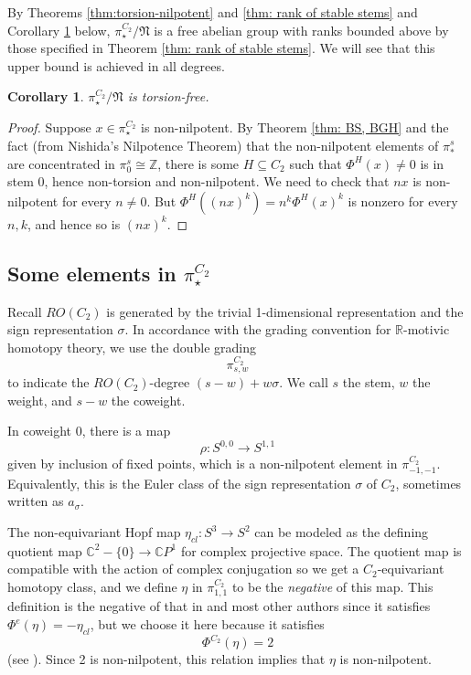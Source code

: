 \documentclass[psamsfonts]{amsart}
\newcommand{\C}{\mathbb C}
\newcommand{\Z}{\mathbb Z}
\newcommand{\fN}{\mathfrak N}
\newtheorem{corollary}[theorem]{Corollary}
\theoremstyle{definition}
\theoremstyle{remark}
\newcommand{\R}{\mathbb{R}}
\numberwithin{equation}{section}
\begin{document}
By Theorems \ref{thm:torsion-nilpotent} and \ref{thm: rank of stable stems} and Corollary \ref{cor:torsion-free} below, $\pi_\star^{C_2}/\fN$ is a free abelian group with ranks bounded above by those specified in Theorem \ref{thm: rank of stable stems}. We will see that this upper bound is achieved in all degrees.



\begin{corollary}\label{cor:torsion-free}
$\pi_\star^{C_2}/\fN$ is torsion-free.
\end{corollary}
\begin{proof}
Suppose $x\in \pi_\star^{C_2}$ is non-nilpotent. By Theorem \ref{thm: BS, BGH}
and the fact (from Nishida's Nilpotence Theorem) that the non-nilpotent elements
of $\pi_*^s$ are concentrated in $\pi_0^s \cong \Z$, there is some
$H\subseteq C_2$ such that $\Phi^H(x)\neq 0$ is in stem 0, hence non-torsion
and non-nilpotent. We need to check that
$nx$ is non-nilpotent for every $n\neq 0$. But $\Phi^H((nx)^k)=n^k \Phi^H(x)^k$
is nonzero for every $n,k$, and hence so is $(nx)^k$.
\end{proof}



\subsection{Some elements in $\pi_\star^{C_2}$}\label{sec:elements}
Recall $RO(C_2)$ is generated by the trivial 1-dimensional representation and the sign representation $\sigma$. In accordance with the grading convention for $\R$-motivic homotopy theory, we use the double grading
\[\pi_{s, w}^{C_2}\]
to indicate the $RO(C_2)$-degree $(s-w)+w\sigma$. We call $s$ the stem, $w$ the weight, and $s-w$ the coweight.

In coweight 0, there is a map
\[\rho: S^{0,0}\to S^{1,1}\]
given by inclusion of fixed points, which is a non-nilpotent element in $\pi_{-1,-1}^{C_2}$. Equivalently, this is the Euler class of the sign representation $\sigma$ of $C_2$, sometimes written as $a_\sigma$.

The non-equivariant Hopf map $\eta_{cl} : S^3\to S^2$ can be modeled as the defining quotient map $\C^2-\{0\}\to \C P^1$ for complex projective space. The quotient map is compatible with the action of complex conjugation so we get a $C_2$-equivariant homotopy class,
and we define $\eta$ in $\pi_{1,1}^{C_2}$ to be the \emph{negative} of this map.
This definition is the negative of that in \cite{GHIR} and most other authors
since it satisfies $\Phi^e(\eta)=-\eta_{cl}$, but we choose it here because it
satisfies
$$ \Phi^{C_2}(\eta)=2 $$
(see \cite[Remark 10.8]{GHIR}).
Since 2 is non-nilpotent, this relation implies that $\eta$ is non-nilpotent.
\end{document}
